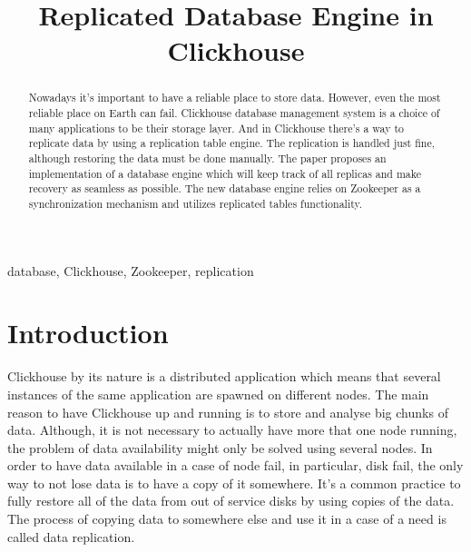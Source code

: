 \documentclass[conference]{IEEEtran}
\begin{document}
\title{Replicated Database Engine in Clickhouse
}

\author{
}

\maketitle

\begin{abstract}
Nowadays it's important to have a reliable place to store data.
However, even the most reliable place on Earth can fail.
Clickhouse database management system is a choice of many applications
to be their storage layer. And in Clickhouse there's a way to replicate data
by using a replication table engine. The replication is handled just fine,
although restoring the data must be done manually.
The paper proposes an implementation of a database engine which will
keep track of all replicas and make recovery as seamless as possible.
The new database engine relies on Zookeeper as a synchronization mechanism and utilizes replicated
tables functionality.
\end{abstract}

\begin{IEEEkeywords}
database, Clickhouse, Zookeeper, replication
\end{IEEEkeywords}

\section{Introduction}

Clickhouse\cite{clickhousedocs} by its nature is a distributed application which means
that several instances of the same application are spawned
on different nodes. The main reason to have Clickhouse up and running is to
store and analyse big chunks of data. Although, it is not necessary to actually
have more that one node running, the problem of data availability might only be solved
using several nodes. In order to have data available in a case of node fail,
in particular, disk fail, the only way to not lose data is to have a copy of it
somewhere. It's a common practice to fully restore all of the data
from out of service disks by using copies of the data. The process of copying
data to somewhere else and use it in a case of a need is called data replication.
\end{document}

